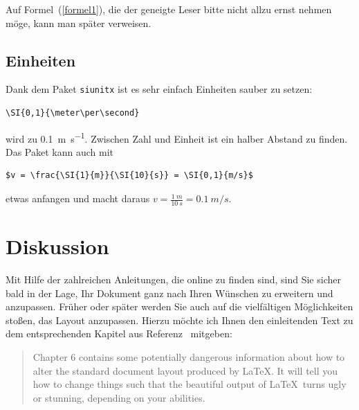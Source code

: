 \documentclass[
	fontsize=11pt,
	paper=a4,
	pagesize=auto,
	parskip=half,
	titlepage=on,
	ngerman
]{scrartcl}
\begin{document}
Auf Formel~(\ref{formel1}), die der geneigte Leser bitte nicht allzu ernst nehmen möge, kann man später verweisen.

\subsection{Einheiten}

Dank dem Paket \texttt{siunitx} ist es sehr einfach Einheiten sauber zu setzen:

\begin{verbatim}
\SI{0,1}{\meter\per\second}
\end{verbatim}

wird zu \SI{0,1}{\meter\per\second}. Zwischen Zahl und Einheit ist ein halber Abstand zu finden. Das Paket kann auch mit

\begin{verbatim}
$v = \frac{\SI{1}{m}}{\SI{10}{s}} = \SI{0,1}{m/s}$
\end{verbatim}

etwas anfangen und macht daraus $v = \frac{\SI{1}{m}}{\SI{10}{s}} = \SI{0,1}{m/s}$.

\section{Diskussion}

Mit Hilfe der zahlreichen Anleitungen, die online zu finden sind, sind Sie sicher bald in der Lage, Ihr Dokument ganz nach Ihren Wünschen zu erweitern und anzupassen. Früher oder später werden Sie auch auf die vielfältigen Möglichkeiten stoßen, das Layout anzupassen. Hierzu möchte ich Ihnen den einleitenden Text zu dem entsprechenden Kapitel aus Referenz~\cite{lshort} mitgeben:

\begin{quote}
	Chapter 6 contains some potentially dangerous information about how to alter the standard document layout produced by \LaTeX. It will tell you how to change things such that the beautiful output of \LaTeX\ turns ugly or stunning, depending on your abilities.
\end{quote}
\end{document}
